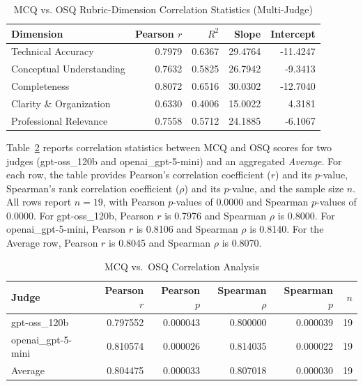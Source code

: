 \begin{table}[htbp]
\centering
\caption{MCQ vs. OSQ Rubric-Dimension Correlation Statistics (Multi-Judge)}
\label{tab:mcq_osq_rubric_corr_mj}
\begin{tabular}{lrrrr}
\toprule
Dimension & Pearson $r$ & $R^2$ & Slope & Intercept \\
\midrule
Technical Accuracy & 0.7979 & 0.6367 & 29.4764 & -11.4247 \\
Conceptual Understanding & 0.7632 & 0.5825 & 26.7942 & -9.3413 \\
Completeness & 0.8072 & 0.6516 & 30.0302 & -12.7040 \\
Clarity \& Organization & 0.6330 & 0.4006 & 15.0022 & 4.3181 \\
Professional Relevance & 0.7558 & 0.5712 & 24.1885 & -6.1067 \\
\bottomrule
\end{tabular}
\end{table}

Table~\ref{tab:mcq_osq_corr} reports correlation statistics between MCQ and OSQ scores for two judges (gpt-oss\_120b and openai\_gpt-5-mini) and an aggregated \textit{Average}. For each row, the table provides Pearson's correlation coefficient ($r$) and its $p$-value, Spearman's rank correlation coefficient ($\rho$) and its $p$-value, and the sample size $n$. All rows report $n=19$, with Pearson $p$-values of 0.0000 and Spearman $p$-values of 0.0000. For gpt-oss\_120b, Pearson $r$ is 0.7976 and Spearman $\rho$ is 0.8000. For openai\_gpt-5-mini, Pearson $r$ is 0.8106 and Spearman $\rho$ is 0.8140. For the Average row, Pearson $r$ is 0.8045 and Spearman $\rho$ is 0.8070.


\begin{table}[htbp]
\centering
\caption{MCQ vs.\ OSQ Correlation Analysis}
\label{tab:mcq_osq_corr}
\begin{tabular}{lrrrrr}
\toprule
Judge & Pearson $r$ & Pearson $p$ & Spearman $\rho$ & Spearman $p$ & $n$ \\
\midrule
gpt-oss\_120b & 0.797552 & 0.000043 & 0.800000 & 0.000039 & 19 \\
openai\_gpt-5-mini & 0.810574 & 0.000026 & 0.814035 & 0.000022 & 19 \\
Average & 0.804475 & 0.000033 & 0.807018 & 0.000030 & 19 \\
\bottomrule
\end{tabular}
\end{table}




